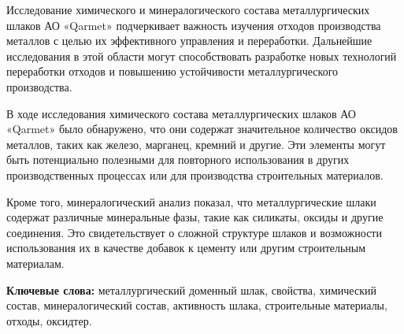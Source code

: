 Исследование химического и минералогического состава металлургических
шлаков АО «Qarmet» подчеркивает важность изучения отходов производства
металлов с целью их эффективного управления и переработки. Дальнейшие
исследования в этой области могут способствовать разработке новых
технологий переработки отходов и повышению устойчивости
металлургического производства.

В ходе исследования химического состава металлургических шлаков АО
«Qarmet» было обнаружено, что они содержат значительное количество
оксидов металлов, таких как железо, марганец, кремний и другие. Эти
элементы могут быть потенциально полезными для повторного использования
в других производственных процессах или для производства строительных
материалов.

Кроме того, минералогический анализ показал, что металлургические шлаки
содержат различные минеральные фазы, такие как силикаты, оксиды и другие
соединения. Это свидетельствует о сложной структуре шлаков и возможности
использования их в качестве добавок к цементу или другим строительным
материалам.

{\bfseries Ключевые слова:} металлургический доменный шлак, свойства,
химический состав, минералогический состав, активность шлака,
строительные материалы, отходы, оксидтер.

